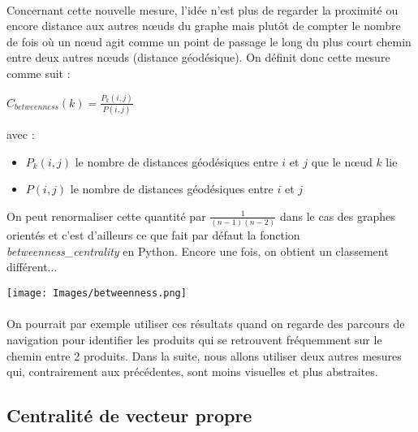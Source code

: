 \documentclass[14pt, openany]{article}
\begin{document}
\paragraph{}
Concernant cette nouvelle mesure, l'idée n'est plus de regarder la proximité ou encore distance aux autres nœuds du graphe mais plutôt de compter le nombre de fois où un nœud agit comme un point de passage le long du plus court chemin entre deux autres nœuds (distance géodésique). On définit donc cette mesure comme suit :\\
\begin{center}
$C_{betweenness}(k)=\frac{P_k(i,j)}{P(i,j)}$
\end{center}
avec :
\begin{itemize}
\item $P_k(i,j)$ le nombre de distances géodésiques entre $i$ et $j$ que le nœud $k$ lie
\item $P(i,j)$ le nombre de distances géodésiques entre $i$ et $j$
\end{itemize}
On peut renormaliser cette quantité par $\frac{1}{(n-1)(n-2)}$ dans le cas des graphes orientés et c'est d'ailleurs ce que fait par défaut la fonction \textit{betweenness\_centrality} en Python. Encore une fois, on obtient un classement différent...

\begin{center}
\texttt{[image: Images/betweenness.png]}
\label{fig1}
\end{center}
\paragraph{}
On pourrait par exemple utiliser ces résultats quand on regarde des parcours de navigation pour identifier les produits qui se retrouvent fréquemment sur le \og chemin \fg{} entre 2 produits. Dans la suite, nous allons utiliser deux autres mesures qui, contrairement aux précédentes, sont moins visuelles et plus abstraites.

\subsection{Centralité de vecteur propre}
\end{document}
